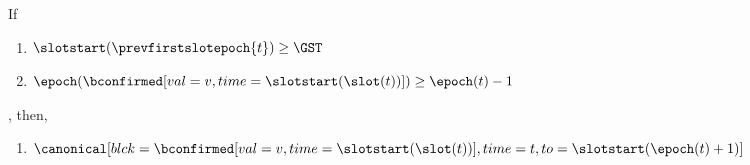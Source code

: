 \documentclass{article}
\begin{document}
\begin{lemma}\label{lem:canonical-for-current-epoch-with-extra-assum}
    If
    \begin{enumerate}
        \item $\slotstart(\prevfirstslotepoch{t})\geq \GST$
        \item $\epoch(\bconfirmed[val=v,time=\slotstart(\slot(t))])\geq\epoch(t)-1$
    \end{enumerate},
    then,
    \begin{enumerate}
        \item $\canonical[blck={\bconfirmed[val=v,time=\slotstart(\slot(t))]},time=t, to=\slotstart(\epoch(t)+1)]$
    \end{enumerate}
\end{lemma}
\end{document}
